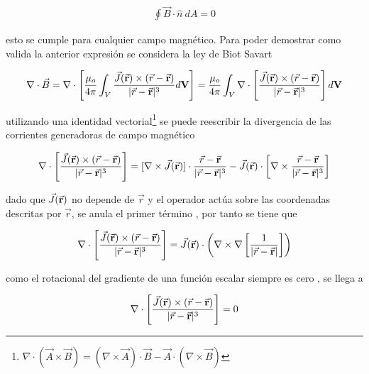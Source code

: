 \begin{eqnarray}
    \oint \vec{B}\cdot\hat{n}\  dA = 0
\end{eqnarray}

\noindent esto se cumple para cualquier campo magnético. Para poder demostrar como valida  la anterior expresión se considera la ley de Biot Savart \cite{kleber}

\begin{eqnarray}
    \nabla\cdot\vec{B} = \nabla\cdot\left[\frac{\mu_{o}}{4\pi}\int_{V}\frac{\vec{J}(\vec{\bf{r}})\times(\vec{r}-\vec{\bf{r}})}{|\vec{r}-\vec{\bf{r}}|^{3}}d\bf{V}\right] = \frac{\mu_{o}}{4\pi}\int_{V}\nabla\cdot\left[\frac{\vec{J}(\vec{\bf{r}})\times(\vec{r}-\vec{\bf{r}})}{|\vec{r}-\vec{\bf{r}}|^{3}}\right]d\bf{V}
\end{eqnarray}

\noindent utilizando una identidad  vectorial\footnote{$\nabla\cdot(\vec{A}\times \vec{B}) = (\nabla \times \vec{A})\cdot \vec{B} - \vec{A}\cdot(\nabla \times \vec{B})$} se puede reescribir la divergencia de las corrientes generadoras de campo magnético 

\begin{eqnarray}
    \nabla\cdot\left[\frac{\vec{J}(\vec{\bf{r}})\times(\vec{r}-\vec{\bf{r}})}{|\vec{r}-\vec{\bf{r}}|^{3}}\right] = [\nabla \times \vec{J}(\vec{\bf{r}})]\cdot \frac{\vec{r}-\vec{\bf{r}}}{|\vec{r}-\vec{\bf{r}}|^{3}}- \vec{J}(\vec{\bf{r}})\cdot\left[\nabla\times\frac{\vec{r}-\vec{\bf{r}}}{|\vec{r}-\vec{\bf{r}}|^{3}}\right]
\end{eqnarray}

\noindent dado que $\vec{J}(\vec{\bf{r}})$ no depende de $\vec{r}$ y el operador actúa sobre las coordenadas descritas por $\vec{r}$, se anula el primer término , por tanto se tiene que 

\begin{eqnarray}
     \nabla\cdot\left[\frac{\vec{J}(\vec{\bf{r}})\times(\vec{r}-\vec{\bf{r}})}{|\vec{r}-\vec{\bf{r}}|^{3}}\right] = \vec{J}(\vec{\bf{r}})\cdot\left(\nabla\times\nabla\left[\frac{1}{|\vec{r}-\vec{\bf{r}}|}\right]\right)
\end{eqnarray}

\noindent como el rotacional del gradiente de una función escalar siempre es cero \cite{Arfken}, se llega a 

\begin{eqnarray}
    \nabla\cdot\left[\frac{\vec{J}(\vec{\bf{r}})\times(\vec{r}-\vec{\bf{r}})}{|\vec{r}-\vec{\bf{r}}|^{3}}\right] = 0
\end{eqnarray}

